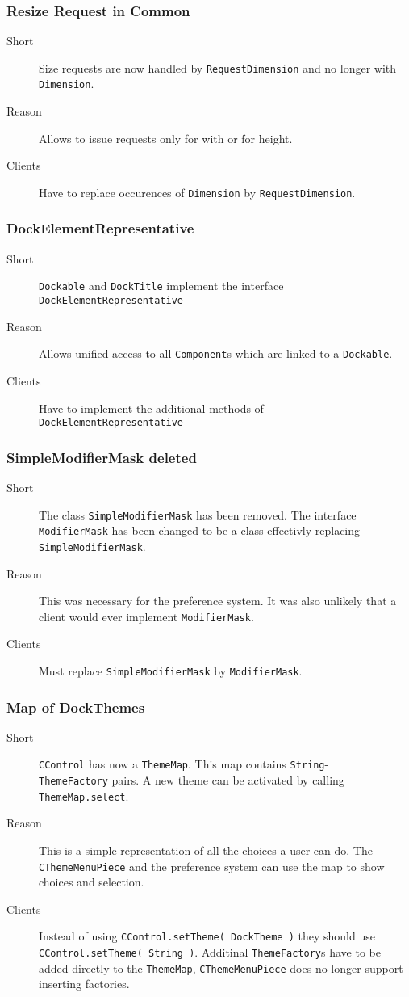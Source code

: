 \documentclass[a4paper,10pt]{article}
\newcommand{\src}[1]{\lstinline[basicstyle=\normalsize\ttfamily,keywordstyle=\normalsize\ttfamily,identifierstyle=\normalsize\ttfamily]|#1|}
\newcommand{\short}{\item[Short]}
\newcommand{\why}{\item[Reason]}
\newcommand{\clients}{\item[Clients]}
\begin{document}
\subsubsection{Resize Request in Common}
\begin{description}
 \short Size requests are now handled by \src{RequestDimension} and no longer with \src{Dimension}.
 \why Allows to issue requests only for with or for height.
 \clients Have to replace occurences of \src{Dimension} by \src{RequestDimension}.
\end{description}

\subsubsection{DockElementRepresentative}
\begin{description}
 \short \src{Dockable} and \src{DockTitle} implement the interface \\\src{DockElementRepresentative}
 \why Allows unified access to all \src{Component}s which are linked to a \src{Dockable}.
 \clients Have to implement the additional methods of \\\src{DockElementRepresentative}
\end{description}

\subsubsection{SimpleModifierMask deleted}
\begin{description}
 \short The class \src{SimpleModifierMask} has been removed. The interface \\\src{ModifierMask} has been changed to be
a class effectivly replacing \\\src{SimpleModifierMask}.
 \why This was necessary for the preference system. It was also unlikely that a client would ever implement \src{ModifierMask}.
 \clients Must replace \src{SimpleModifierMask} by \src{ModifierMask}.
\end{description}

\subsubsection{Map of DockThemes}
\begin{description}
 \short \src{CControl} has now a \src{ThemeMap}. This map contains \src{String}-\\\src{ThemeFactory} pairs. A new theme can be activated by calling \src{ThemeMap.select}.
 \why This is a simple representation of all the choices a user can do. The \src{CThemeMenuPiece} and the preference system can use the map to show choices and selection.
 \clients Instead of using \src{CControl.setTheme( DockTheme )} they should use \src{CControl.setTheme( String )}. Additinal \src{ThemeFactory}s have to be added directly to the \src{ThemeMap}, \src{CThemeMenuPiece} does no longer support inserting factories.
\end{description}
\end{document}
